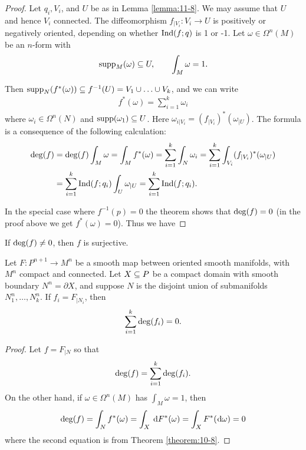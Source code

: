 \begin{proof}
  Let $q_i, V_i$, and $U$ be as in Lemma \ref{lemma:11-8}. We may assume that $U$ and
hence $V_i$ connected. The diffeomorphism $f_{|V_i}:V_i\to U$ is positively or negatively
oriented, depending on whether $\mathrm{Ind}(f; q)$ is 1 or -1. Let $\omega\in\Omega^n(M)$ be an
$n$-form with
\begin{align*}
  \operatorname{supp}_M(\omega)\subseteq U, \qquad \int_M \omega = 1.
\end{align*}

Then $\operatorname{supp}_N(f^*(\omega))\subseteq f^{-1}(U) = V_1\cup\ldots\cup V_k$, and we can write 
\begin{align*}
  f^*(\omega) = \sum_{i=1}^k{\omega_i}
\end{align*}
where $\omega_i\in\Omega^n(N)$ and $\operatorname{supp}(\omega_1)\subseteq U$. Here $\omega_{i|V_i} = (f_{|V_i})^*(\omega_{|U})$. The 
formula is a consequence of the following calculation:
\begin{align*}
  \mathrm{deg}(f) 
  & = \mathrm{deg}(f)\int_M\omega 
    = \int_Mf^*(\omega) 
    = \sum_{i=1 }^{k }{\int_N \omega_i}
    = \sum_{i=1}^{k}{\int_{V_i} (f_{|V_i})^*(\omega_{|U})} \\
  & = \sum_{i=1 }^{k }{\mathrm{Ind}(f; q_i)\int_U \omega_{|U} }
    = \sum_{i=1}^{k}{\mathrm{Ind}(f; q_i)}.
\end{align*} 

In the special case where $f^{-1}(p) = 0$ the theorem shows that $\mathrm{deg}(f) = 0$ (in the
proof above we get $f^*(\omega) = 0$). Thus we have 
\end{proof}

\begin{corollary}\label{corollary:11-10}
  If $\mathrm{deg}(f)\neq 0$, then $f$ is surjective.
\end{corollary}

\begin{proposition}\label{proposition:11-11}
  Let $F:P^{n+1}\to M^n$ be a smooth map between oriented smooth
  manifolds, with $M^n$ compact and connected. Let $X\subseteq P$ be a compact domain with
  smooth boundary $N^n =\partial X$, and suppose $N$ is the disjoint union of submanifolds
  $N_1^n,\ldots, N_k^n$. If $f_i = F_{|N_i}$, then
  \begin{align*}
    \sum_{i=1 }^{k }{\mathrm{deg}(f_i)} = 0.
  \end{align*}
\end{proposition}

\begin{proof}
  Let $f = F_{|N}$ so that 
  \begin{align*}
    \mathrm{deg}(f) = \sum_{i=1}^{k}{\mathrm{deg}(f_i)}.
  \end{align*}
  On the other hand, if $\omega\in\Omega^n(M)$ has $\int_M \omega=1$, then 
  \begin{align*}
    \R{deg}(f) = \int_N f^*(\omega)
    = \int_X \dd F^*(\omega)
    = \int_X F^*(\!\dd\omega)
    = 0
  \end{align*}
  where the second equation is from Theorem \ref{theorem:10-8}.
\end{proof}

